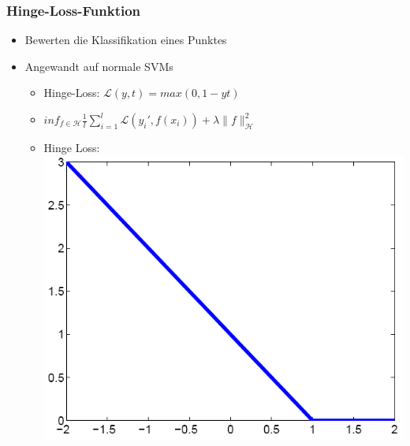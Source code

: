 \documentclass{beamer}
\begin{document}
\begin{frame}
\frametitle{Hinge-Loss-Funktion}
    \begin{itemize}
        \item Bewerten die Klassifikation eines Punktes
        \item Angewandt auf normale SVMs
        \begin{itemize}
            \item Hinge-Loss: $\mathcal{L}(y, t) = max(0, 1 − yt)$
            \item $inf_{f \in \mathcal{H}} \frac{1}{l} \sum_{i=1}^l \mathcal{L} (y_i', f(x_i)) + \lambda \|f\|^2_\mathcal{H}$
            \item Hinge Loss: \includegraphics[scale=0.2]{img/hinge_loss_function.png}
        \end{itemize}	
    \end{itemize}
\end{frame}
\end{document}
